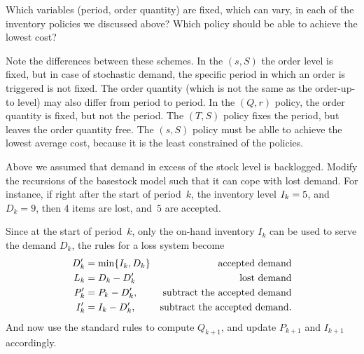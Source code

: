 \documentclass[stochastic-or.tex]{subfiles}
\begin{document}
\begin{exercise}
  Which variables (period, order quantity) are fixed, which can  vary, in each of the inventory policies  we discussed above? Which policy should be able to achieve the lowest cost?
  \begin{solution}
  Note the differences between these schemes.
In the $(s,S)$ the order level is fixed, but in case of stochastic demand, the specific period in which an order is triggered is not fixed.
The order quantity (which is not the same as the order-up-to level) may also differ from period to period.
In the $(Q,r)$ policy, the order quantity is fixed, but not the period.
The $(T,S)$ policy fixes the period, but leaves the order quantity free.
The $(s,S)$ policy must be ablle to achieve the lowest average cost, because it is the least constrained of the policies.
  \end{solution}
\end{exercise}



\begin{exercise}
Above we assumed that demand in excess of the  stock level is backlogged.
Modify the recursions of the basestock model such that it can cope with lost demand.
For instance, if right after the start of period~$k$, the inventory level $I_{k}= 5$, and $D_k=9$, then 4 items are lost, and~$5$ are accepted.
\begin{solution}
Since at the start of period~$k$, only the on-hand inventory $I_{k}$ can be used to serve the demand $D_{k}$, the rules for a loss system become
\begin{align*}
D_k' &= \min\{I_k, D_k\} & \text{accepted demand}\\
L_k &= D_{k} - D_{k}' & \text{lost demand}\\
P_k' &= P_{k} - D_k', &\text{subtract the accepted demand}\\
I_k' &= I_{k} - D_k', &\text{subtract the accepted demand}.
\end{align*}
And now use the standard rules to compute $Q_{k+1}$, and update $P_{k+1}$ and $I_{k+1}$ accordingly.
\end{solution}
\end{exercise}





\end{document}
